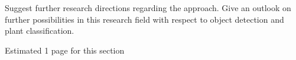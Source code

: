 \documentclass[draft,final]{vutinfth} %
\begin{document}
Suggest further research directions regarding the approach. Give an
outlook on further possibilities in this research field with respect
to object detection and plant classification.

Estimated 1 page for this section

\backmatter

\listoffigures %

\cleardoublepage %
\listoftables %


\printindex

\printglossaries

%
\printbibliography
\end{document}
